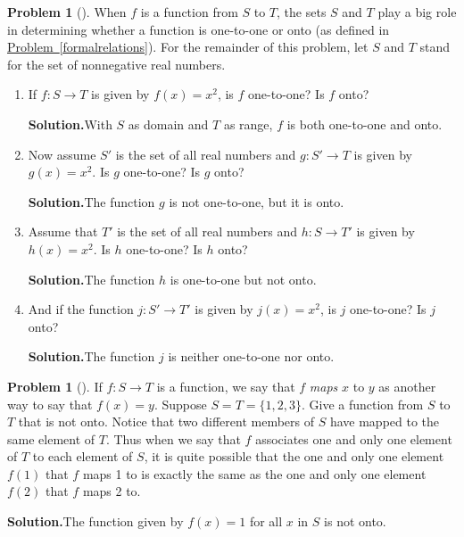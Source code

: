 \documentclass[10pt,]{book}
\theoremstyle{plain}
\theoremstyle{definition}
\newtheorem{activity}[project]{Problem}
\theoremstyle{definition}
\numberwithin{equation}{chapter}
\begin{document}
\begin{activity}[]\label{activity-330}
When \(f\) is a function from \(S\) to \(T\), the sets \(S\) and \(T\) play a big role in determining whether a function is one-to-one or onto (as defined in \hyperref[formalrelations]{Problem~\ref{formalrelations}}). For the remainder of this problem, let \(S\) and \(T\) stand for  the set of nonnegative real numbers.%
\begin{enumerate}[font=\bfseries,label=(\alph*),ref=\alph*]
\item\label{task-236} If \(f:S\rightarrow T\) is given by \(f(x) =x^2\), is \(f\) one-to-one? Is \(f\) onto?%
\par\medskip\noindent%
\textbf{Solution.}\quad With \(S\) as domain and \(T\) as range, \(f\) is both one-to-one and onto.%
\item\label{task-237} Now assume \(S'\) is the set of all real numbers and \(g:S'\rightarrow T\) is given by \(g(x) = x^2\). Is \(g\) one-to-one? Is \(g\) onto?%
\par\medskip\noindent%
\textbf{Solution.}\quad The function \(g\) is not one-to-one, but it is onto.%
\item\label{task-238} Assume that \(T'\) is the set of all real numbers and \(h:S\rightarrow T'\) is given by \(h(x) = x^2\). Is \(h\) one-to-one? Is \(h\) onto?%
\par\medskip\noindent%
\textbf{Solution.}\quad The function \(h\) is one-to-one but not onto.%
\item\label{task-239} And if the function \(j:S'\rightarrow T'\) is given by \(j(x)=x^2\), is \(j\) one-to-one? Is \(j\) onto?%
\par\medskip\noindent%
\textbf{Solution.}\quad The function \(j\) is neither one-to-one nor onto.%
\end{enumerate}
\end{activity}
\begin{activity}[]\label{activity-331}
If \(f:S\rightarrow T\) is a function, we say that \(f\) \emph{maps} \(x\) to \(y\) as another way to say that \(f(x)=y\). Suppose \(S=T=\{1,2,3\}\). Give a function from \(S\) to \(T\) that is not onto. Notice that two different members of \(S\) have mapped to the same element of \(T\). Thus when we say that \(f\) associates one and only one element of \(T\) to each element of \(S\), it is quite possible that the one and only one element \(f(1)\) that \(f\) maps 1 to is exactly the same as the one and only one element \(f(2)\) that \(f\) maps 2 to.%
\par\medskip\noindent%
\textbf{Solution.}\quad The function given by \(f(x)=1\) for all \(x\) in \(S\) is not onto.%
\end{activity}
\typeout{************************************************}
\typeout{************************************************}
\end{document}
